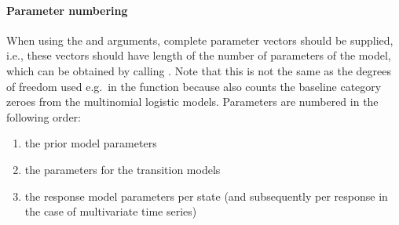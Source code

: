 \documentclass[article]{jss}
\begin{document}
\paragraph{Parameter numbering} When using the  and
 arguments, complete parameter vectors should be supplied,
i.e., these vectors should have length of the number of parameters of
the model, which can be obtained by calling .  Note
that this is not the same as the degrees of freedom used e.g.\ in the
 function because  also counts the baseline
category zeroes from the multinomial logistic models.  Parameters are
numbered in the following order:
\begin{enumerate}
	\item  the prior model parameters
	\item  the parameters for the transition models
	\item  the response model parameters per state (and subsequently
	per response in the case of multivariate time series)
\end{enumerate}
\end{document}
